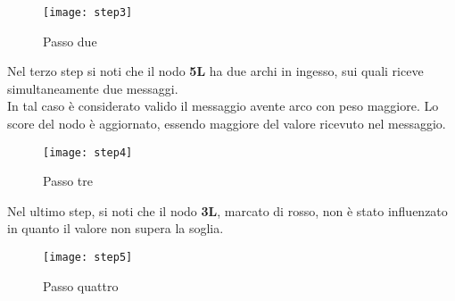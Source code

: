 \begin{figure}[!htbp]
  \begin{center}
    \texttt{[image: step3]}
  	\caption{Passo due}
  	\label{step3}
  \end{center}
\end{figure}
\clearpage
Nel terzo step si noti che il nodo \textbf{5L} ha due archi in ingesso, sui quali riceve simultaneamente
due messaggi.\\
In tal caso è considerato valido il messaggio avente arco con peso maggiore.
Lo score del nodo è aggiornato, essendo maggiore del valore ricevuto nel messaggio.\\
\begin{figure}[!htbp]
  \begin{center}
    \texttt{[image: step4]}
  	\caption{Passo tre}
  	\label{step4}
  \end{center}
\end{figure}
\clearpage

Nel ultimo step, si noti che il nodo \textbf{3L}, marcato di rosso, non è stato influenzato
in quanto il valore non supera la soglia.
\begin{figure}[!htbp]
  \begin{center}
    \texttt{[image: step5]}
  	\caption{Passo quattro}
  	\label{step5}
  \end{center}
\end{figure}
\clearpage
